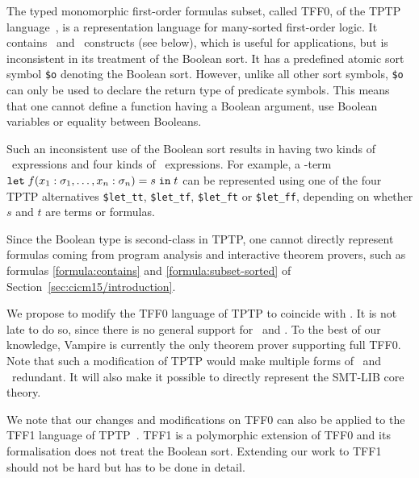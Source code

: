 The typed monomorphic first-order formulas subset, called TFF0, of the TPTP language~\cite{TPTP}, is a representation language for many-sorted first-order logic. It contains \ITE\ and \LETIN\ constructs (see below), which is useful for applications, but is inconsistent in its treatment of the Boolean sort. It has a predefined atomic sort symbol \lstinline'$o' denoting the Boolean sort. However, unlike all other sort symbols, \lstinline'$o' can only be used to declare the return type of predicate symbols. This means that one cannot define a function having a Boolean argument, use Boolean variables or equality between Booleans. 

Such an inconsistent use of the Boolean sort results in having two kinds of \ITE\ expressions and four kinds of \LETIN\ expressions. For example, a \folb-term $\mathtt{let}\;{f(x_1:\sigma_1, \ldots, x_n:\sigma_n)}={s}\;\allowbreak\mathtt{in}\;{t}$ can be represented using one of the four TPTP alternatives \lstinline'$let_tt', \lstinline'$let_tf', \lstinline'$let_ft' or \lstinline'$let_ff', depending on whether $s$ and $t$ are terms or formulas. 

Since the Boolean type is second-class in TPTP, one cannot directly represent formulas coming from program analysis and interactive theorem provers, such as formulas \eqref{formula:contains} and \eqref{formula:subset-sorted} of Section~\ref{sec:cicm15/introduction}.

We propose to modify the TFF0 language of TPTP to coincide with \folb. It is not late to do so, since there is no general support for \ITE\ and \LETIN. To the best of our knowledge, Vampire is currently the only theorem prover supporting full TFF0. Note that such a modification of TPTP would make multiple forms of \ITE\ and \LETIN\ redundant. It will also make it possible to directly represent the SMT-LIB core theory.

We note that our changes and modifications on TFF0 can also be applied to the TFF1 language of TPTP~\cite{tff1}. TFF1 is  a polymorphic extension of TFF0 and its formalisation  does not treat the Boolean sort. Extending our work to TFF1 should not be hard but has to be done in detail.
